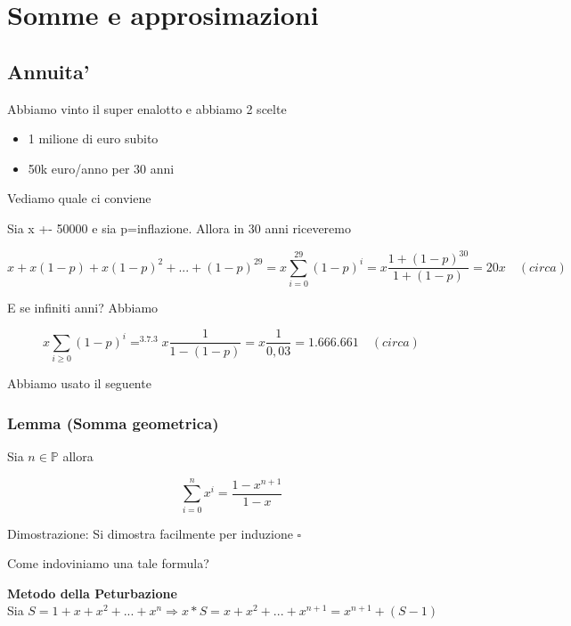 \documentclass{article}
\begin{document}
        \section{Somme e approsimazioni}
        \subsection{Annuita'}
        \begin{flushleft}
          Abbiamo vinto il super enalotto e abbiamo 2 scelte
          \begin{itemize}
            \item 1 milione di euro subito
            \item 50k euro/anno per 30 anni
          \end{itemize}
          Vediamo quale ci conviene
        \end{flushleft}
        \begin{flushleft}
          Sia x +- 50000 e sia p=inflazione. Allora in 30 anni riceveremo
        \end{flushleft}
        \begin{equation}
          x+x(1-p)+x(1-p)^2+...+(1-p)^{29}=x\sum_{i=0}^{29}(1-p)^i=x \frac{1+(1-p)^{30}}{1+(1-p)}=20x \quad (circa)
        \end{equation}
        \begin{flushleft}
          E se infiniti anni? Abbiamo
        \end{flushleft}
        \begin{equation}
          x \sum_{i \geq 0} (1-p)^i =^{3.7.3} x \frac{1}{1-(1-p)}=x \frac{1}{0,03}=1.666.661 \quad (circa)
        \end{equation}
        \begin{flushleft}
          Abbiamo usato il seguente
        \end{flushleft}
        \subsubsection{Lemma (Somma geometrica)}
        \begin{flushleft}
          Sia $n \in \mathbb{P}$ allora
        \end{flushleft}
        \begin{equation}
          \sum_{i=0}^n x^i = \frac{1-x^{n+1}}{1-x}
        \end{equation}
        \begin{flushleft}
          Dimostrazione: Si dimostra facilmente per induzione $\square$
        \end{flushleft}
        \begin{flushleft}
          Come indoviniamo una tale formula?
        \end{flushleft}
        \begin{flushleft}
          \textbf{Metodo della Peturbazione} \\ 
          Sia $S=1+x+x^2+...+x^n \Rightarrow x*S=x+x^2+...+x^{n+1}=x^{n+1}+(S-1)$
        \end{flushleft}
\end{document}
